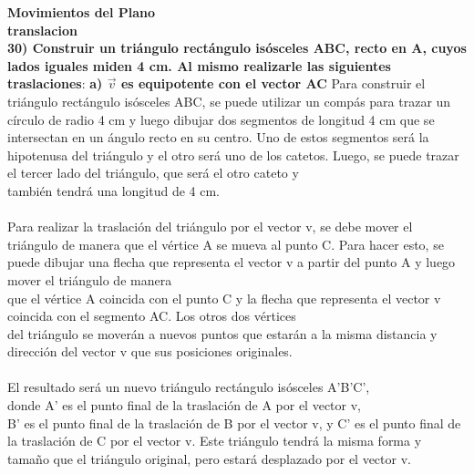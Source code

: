 \documentclass{article}
\begin{document}
{\LARGE \textbf{Movimientos del Plano }} \\
{\large \textbf{translacion}} \\
{\bf 30) Construir un triángulo rectángulo isósceles ABC, recto en A, cuyos lados iguales miden 4 cm. Al mismo realizarle las siguientes traslaciones}:
{\bf a) $\vec{v}$ es equipotente con el vector AC}
Para construir el triángulo rectángulo isósceles ABC, se puede utilizar un compás para trazar un círculo de radio 4 cm y luego dibujar dos segmentos de longitud 4 cm que se intersectan en un ángulo recto en su centro. Uno de estos segmentos será la hipotenusa del triángulo y el otro será uno de los catetos. Luego, se puede trazar el tercer lado del triángulo, que será el otro cateto y\\
también tendrá una longitud de 4 cm.\\
\\
Para realizar la traslación del triángulo por el vector v, se debe mover el triángulo de manera que el vértice A se mueva al punto C. Para hacer esto, se puede dibujar una flecha que representa el vector v a partir del punto A y luego mover el triángulo de manera\\
que el vértice A coincida con el punto C y la flecha que representa el vector v coincida con el segmento AC. Los otros dos vértices\\
del triángulo se moverán a nuevos puntos que estarán a la misma distancia y dirección del vector v que sus posiciones originales.\\
\\
El resultado será un nuevo triángulo rectángulo isósceles A'B'C',\\
donde A' es el punto final de la traslación de A por el vector v,\\
B' es el punto final de la traslación de B por el vector v, y C' es el punto final de la traslación de C por el vector v. Este triángulo tendrá la misma forma y tamaño que el triángulo original, pero estará desplazado por el vector v.\\
\\
\end{document}
